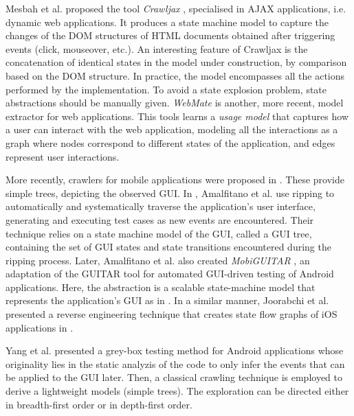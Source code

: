 Mesbah et al. proposed the tool \textit{Crawljax}
\cite{crawljax:tweb12}, specialised in AJAX applications, i.e.
dynamic web applications.  It produces a state machine model to
capture the changes of the DOM structures of HTML documents
obtained after triggering events (click, mouseover, etc.). An
interesting feature of Crawljax is the concatenation of identical
states in the model under construction, by comparison based on
the DOM structure. In practice, the model encompasses all the
actions performed by the implementation. To avoid a state
explosion problem, state abstractions should be manually given.
\textit{WebMate} \cite{webmate12} is another, more recent, model
extractor for web applications. This tools learns a \textit{usage
model} that captures how a user can interact with the web
application, modeling all the interactions as a graph where
nodes correspond to different states of the application, and
edges represent user interactions.

More recently, crawlers for mobile applications were proposed in
\cite{Amalfitano:2012:UGR:2351676.2351717,Joorabchi:2012:REI:2420240.2420457,MobiGUITARIEEESoftware2014}.
These provide simple trees, depicting the observed GUI. In
\cite{Amalfitano:2012:UGR:2351676.2351717}, Amalfitano et al. use
ripping to automatically and systematically traverse the
application's user interface, generating and executing test cases
as new events are encountered. Their technique relies on a state
machine model of the GUI, called a GUI tree, containing the set
of GUI states and state transitions encountered during the
ripping process.  Later, Amalfitano et al. also created
\textit{MobiGUITAR} \cite{MobiGUITARIEEESoftware2014}, an
adaptation of the GUITAR tool for automated GUI-driven testing of
Android applications. Here, the abstraction is a scalable
state-machine model that represents the application's GUI as in
\cite{Amalfitano:2012:UGR:2351676.2351717}. In a similar manner,
Joorabchi et al. presented a reverse engineering technique that
creates state flow graphs of iOS applications in
\cite{Joorabchi:2012:REI:2420240.2420457}.

Yang et al. \cite{WPX13} presented a grey-box testing method for
Android applications whose originality lies in the static
analyzis of the code to only infer the events that can be applied
to the GUI later. Then, a classical crawling technique is
employed to derive a lightweight models (simple trees). The
exploration can be directed either in breadth-first order or in
depth-first order.

